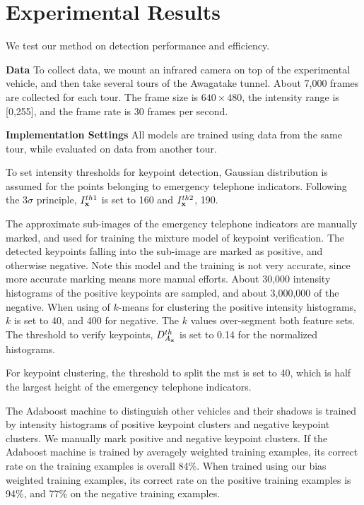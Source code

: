 \section{Experimental Results}
We test our method on detection performance and efficiency.

\textbf{Data} To collect data, we mount  an infrared camera on top of the experimental vehicle, and then  take several tours of the Awagatake tunnel. About 7,000 frames are collected for each tour. The frame size is $640\times 480$, the intensity range is [0,255], and the frame rate is 30 frames per second.

\textbf{Implementation Settings} All models are trained using data from the same tour, while evaluated on data from another tour.

To set intensity thresholds for keypoint detection, Gaussian distribution is assumed for the points belonging to emergency telephone indicators. Following the $3\sigma$ principle, $I^{th1}_{\bf{x}}$ is set to 160 and $I^{th2}_{\bf{x}}$, 190.

The approximate sub-images of the emergency telephone indicators are manually marked, and used for training the mixture model of keypoint verification. The detected keypoints falling into the sub-image are marked as positive, and otherwise negative. Note this model and the training is not very accurate, since more accurate marking means more manual efforts. About 30,000 intensity histograms of the positive keypoints are sampled, and about 3,000,000 of the negative. When using of $k$-means for clustering the positive intensity histograms, $k$ is set to 40, and 400 for negative. The $k$ values over-segment both feature sets. The threshold to verify keypoints, $D^{th}_{A_{\bf{x}}}$ is set to 0.14 for the normalized histograms.

For keypoint clustering, the threshold to split the mst is set to 40, which is half the largest height of the emergency telephone indicators.

The Adaboost machine to distinguish other vehicles and their shadows is trained by intensity histograms of positive keypoint clusters and negative keypoint clusters. We manually mark  positive  and  negative keypoint clusters. If the Adaboost machine is trained by averagely weighted training examples, its correct rate on the training examples is overall 84\%. When trained using our bias weighted training examples, its correct rate on the positive training examples is 94\%, and 77\% on the negative training examples.


